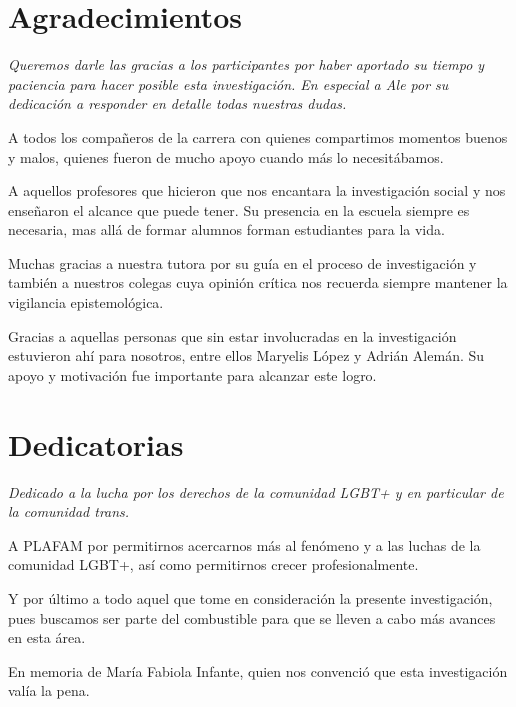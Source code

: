 \chapter{Agradecimientos}

 \begin{flushleft}
    \itshape
Queremos darle las gracias a los participantes por haber aportado su tiempo
y paciencia para hacer posible esta investigación. En especial a Ale por su
dedicación a responder en detalle todas nuestras dudas.

A todos los compañeros de la carrera con quienes compartimos momentos buenos y
malos, quienes fueron de mucho apoyo cuando más lo necesitábamos.

A aquellos profesores que hicieron que nos encantara la investigación social y
nos enseñaron el alcance que puede tener. Su presencia en la escuela siempre es
necesaria, mas allá de formar alumnos forman estudiantes para la vida.

Muchas gracias a nuestra tutora por su guía en el
proceso de investigación y también a nuestros colegas cuya opinión crítica nos
recuerda siempre mantener la vigilancia epistemológica.

Gracias a aquellas personas que sin estar involucradas en la investigación
estuvieron ahí para nosotros, entre ellos Maryelis López y Adrián Alemán. Su
apoyo y motivación fue importante para alcanzar este logro.

\end{flushleft}

\chapter{Dedicatorias}

\begin{flushleft}
\itshape
Dedicado a la lucha por los derechos de la comunidad LGBT+ y en particular de la
comunidad trans.

A PLAFAM por permitirnos acercarnos más al fenómeno y a las luchas de la
comunidad LGBT+, así como permitirnos crecer profesionalmente.

Y por último a todo aquel que tome en consideración la presente investigación,
pues buscamos ser parte del combustible para que se lleven a cabo más
avances en esta área.

En memoria de María Fabiola Infante, quien nos convenció
que esta investigación valía la pena.

\end{flushleft}

